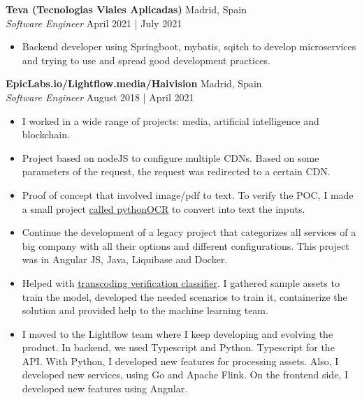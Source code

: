 \documentclass[a4paper]{article}
\begin{document}
\textbf{Teva (Tecnologias Viales Aplicadas)} \hfill Madrid, Spain\\
\textit{Software Engineer} \hfill April 2021 | July 2021\\
\vspace{-1mm}
\begin{itemize} \itemsep 1pt
    \item Backend developer using Springboot, mybatis, sqitch to develop microservices and trying to use and spread good development practices.
\end{itemize}

\textbf{EpicLabs.io/Lightflow.media/Haivision} \hfill Madrid, Spain\\
\textit{Software Engineer} \hfill August 2018 | April 2021\\
\vspace{-1mm}
\begin{itemize} \itemsep 1pt
    \item I worked in a wide range of projects: media, artificial intelligence and blockchain.
    \item Project based on nodeJS to configure multiple CDNs. Based on some parameters of the request, the request was redirected to a certain CDN.
    \item Proof of concept that involved image/pdf to text. To verify the POC, I made a small project \href{https://github.com/dionisioC/pythonOCR}{called pythonOCR} to convert into text the inputs.
    \item Continue the development of a legacy project that categorizes all services of a big company with all their options and different configurations. This project was in Angular JS, Java, Liquibase and Docker.
    \item Helped with \href{https://github.com/livepeer/verification-classifier}{transcoding verification classifier}. I gathered sample assets to train the model, developed the needed scenarios to train it, containerize the solution and provided help to the machine learning team.
    \item I moved to the Lightflow team where I keep developing and evolving the product. In backend, we used Typescript and Python. Typescript for the API. With Python, I developed new features for processing assets. Also, I developed new services, using Go and Apache Flink. On the frontend side, I developed new features using Angular.
\end{itemize}
\end{document}
